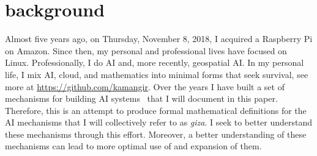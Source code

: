 \section*{background}

Almost five years ago, on Thursday, November 8, 2018, I acquired a Raspberry Pi on Amazon. Since then, my personal and professional lives have focused on Linux. Professionally, I do AI and, more recently, geospatial AI. In my personal life, I mix AI, cloud, and mathematics into minimal forms that seek survival, see more at \url{https://github.com/kamangir}. Over the years I have built a set of mechanisms for building AI systems~\cite{abcli} that I will document in this paper. Therefore, this is an attempt to produce formal mathematical definitions for the AI mechanisms that I will collectively refer to as \emph{giza}. I seek to better understand these mechanisms through this effort. Moreover, a better understanding of these mechanisms can lead to more optimal use of and expansion of them.   